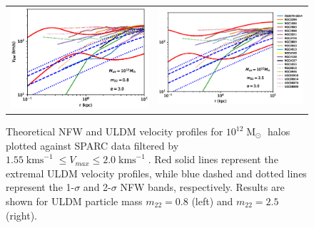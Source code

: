 \documentclass[a4paper,11pt]{article}
\begin{document}
\begin{figure}
\begin{tabular}{cc}
{\includegraphics[scale = 0.65, trim={2.5cm 2.5cm 2.1cm 0.5cm}]{pics/v_12_8_3_paper.eps}} &
{\includegraphics[scale = 0.65, trim={2.1cm 2.5cm 0cm 0.5cm}]{pics/v_12_25_3_paper.eps}}
\end{tabular}
\caption{Theoretical NFW and ULDM velocity profiles for $10^{12}\operatorname{M}_{\odot}$ halos plotted against SPARC data filtered by $1.55 \operatorname{kms}^{-1}\leq V_{max}\leq 2.0 \operatorname{kms}^{-1}$. Red solid lines represent the extremal ULDM velocity profiles, while  blue dashed and dotted lines represent the 1-$\sigma$ and 2-$\sigma$ NFW bands, respectively. Results are shown for ULDM particle mass $m_{22} = 0.8$ (left) and $m_{22} = 2.5 $ (right).}\label{fig:velocity_12}
\end{figure}
\end{document}
